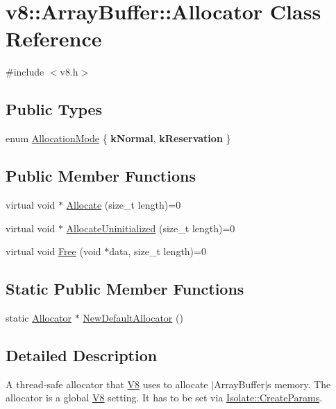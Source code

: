 \hypertarget{classv8_1_1ArrayBuffer_1_1Allocator}{}\section{v8\+:\+:Array\+Buffer\+:\+:Allocator Class Reference}
\label{classv8_1_1ArrayBuffer_1_1Allocator}


{\ttfamily \#include $<$v8.\+h$>$}

\subsection*{Public Types}
\begin{DoxyCompactItemize}
\item 
enum \mbox{\hyperlink{classv8_1_1ArrayBuffer_1_1Allocator_ab106d1fbad7be9f6fd8b0f5c550ac59e}{Allocation\+Mode}} \{ {\bfseries k\+Normal}, 
{\bfseries k\+Reservation}
 \}
\end{DoxyCompactItemize}
\subsection*{Public Member Functions}
\begin{DoxyCompactItemize}
\item 
virtual void $\ast$ \mbox{\hyperlink{classv8_1_1ArrayBuffer_1_1Allocator_a106b0d80120ed04fe9b9675e96f0340b}{Allocate}} (size\+\_\+t length)=0
\item 
virtual void $\ast$ \mbox{\hyperlink{classv8_1_1ArrayBuffer_1_1Allocator_a92b2d5c0a826d3c435e12f3ee178f37a}{Allocate\+Uninitialized}} (size\+\_\+t length)=0
\item 
virtual void \mbox{\hyperlink{classv8_1_1ArrayBuffer_1_1Allocator_a419f59d2a103a5a8863809d7977c9cd8}{Free}} (void $\ast$data, size\+\_\+t length)=0
\end{DoxyCompactItemize}
\subsection*{Static Public Member Functions}
\begin{DoxyCompactItemize}
\item 
static \mbox{\hyperlink{classv8_1_1ArrayBuffer_1_1Allocator}{Allocator}} $\ast$ \mbox{\hyperlink{classv8_1_1ArrayBuffer_1_1Allocator_ab274d606bbc87a2a41f114d55d6da331}{New\+Default\+Allocator}} ()
\end{DoxyCompactItemize}


\subsection{Detailed Description}
A thread-\/safe allocator that \mbox{\hyperlink{classv8_1_1V8}{V8}} uses to allocate $\vert$\+Array\+Buffer$\vert$\textquotesingle{}s memory. The allocator is a global \mbox{\hyperlink{classv8_1_1V8}{V8}} setting. It has to be set via \mbox{\hyperlink{structv8_1_1Isolate_1_1CreateParams}{Isolate\+::\+Create\+Params}}.

